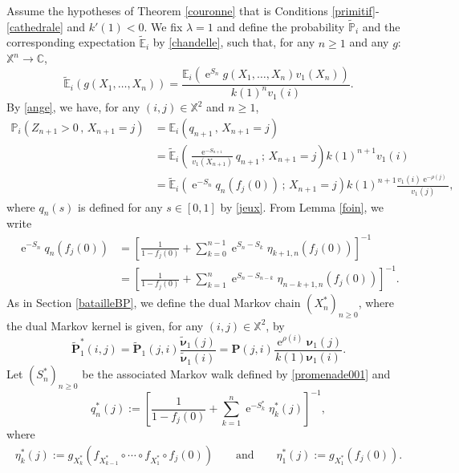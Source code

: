 \documentclass[12pt]{amsart}
\theoremstyle{definition}
\numberwithin{equation}{section}
\def\bb#1{\mathbb{#1}}
\def\bs#1{\boldsymbol{#1}}
\def\bf#1{\mathbf{#1}}
\def\tbf#1{\tilde{\mathbf{#1}}}
\def\tbs#1{\tilde{\boldsymbol{#1}}}
\def\tbb#1{\tilde{\mathbb{#1}}}
\def\geq{\geqslant}
\renewcommand\ll{\lambda}
\DeclareMathOperator{\e}{e}
\begin{document}
Assume the hypotheses of Theorem \ref{couronne} that is  Conditions \ref{primitif}-\ref{cathedrale} and $k'(1)<0$. We fix $\ll = 1$ and define the probability $\tbb P_i$ and the corresponding expectation $\tbb E_i$ by \eqref{chandelle}, such that, for any $n \geq 1$ and any $g$: $\bb X^n \to \bb C$,
\begin{equation}
\label{chandelier}
\tbb E_i \left( g(X_1, \dots, X_n) \right) = \frac{\bb E_i \left( \e^{S_n} g(X_1, \dots, X_n) v_1(X_n) \right)}{k(1)^n v_1(i)}.
\end{equation}
By \eqref{ange}, we have, for any $(i,j) \in \bb X^2$ and $n \geq 1$,
\begin{align*}
\bb P_i \left( Z_{n+1} > 0 \,,\, X_{n+1} = j \right) &= \bb E_i \left( q_{n+1} \,,\, X_{n+1} = j \right) \\
&= \tbb E_i \left( \frac{\e^{-S_{n+1}}}{v_1 \left( X_{n+1} \right)} q_{n+1}  \,;\, X_{n+1} = j \right) k(1)^{n+1} v_1(i) \\
&= \tbb E_i \left( \e^{-S_n} q_n\left( f_j(0) \right)  \,;\, X_{n+1} = j \right) k(1)^{n+1} \frac{v_1(i) \e^{-\rho(j)}}{v_1(j)},
\end{align*}
where $q_n(s)$ is defined for any $s \in [0,1]$ by \eqref{jeux}. From Lemma \ref{foin}, we write
\begin{align}
	\e^{-S_n} q_n\left( f_j(0) \right) &= \left[ \frac{1}{1-f_j(0)} + \sum_{k=0}^{n-1} \e^{S_n -S_k} \eta_{k+1,n}\left( f_j(0) \right) \right]^{-1} \nonumber\\
	&= \left[ \frac{1}{1-f_j(0)} + \sum_{k=1}^{n} \e^{S_n -S_{n-k}} \eta_{n-k+1,n}\left( f_j(0) \right) \right]^{-1}.
	\label{potion001}
\end{align}
As in Section \ref{batailleBP}, we define the dual Markov chain $\left( X_n^* \right)_{n\geq 0}$, where the dual Markov kernel is given, for any $(i,j) \in \bb X^2$, by
\[
\tbf P_1^*(i,j) = \tbf P_1 (j,i) \frac{\tbs \nu_1 (j)}{\tbs \nu_1 (i)} = \bf P(j,i) \frac{\e^{\rho(i)} \bs \nu_1 (j)}{k(1) \bs \nu_1 (i)}.
\]
Let $(S^*_n)_{n\geq 0}$ be the associated Markov walk defined by \eqref{promenade001}
and 
\begin{equation}
\label{chemin}
q_n^*(j) := \left[ \frac{1}{1-f_j(0)} + \sum_{k=1}^{n} \e^{-S_k^*} \eta_k^*(j) \right]^{-1},
\end{equation}
where 
\begin{align}
\label{chemin003}
\eta_k^*(j) := g_{X_k^*} \left( f_{X_{k-1}^*} \circ \cdots \circ f_{X_1^*}\circ f_j (0) \right)  
\qquad \text{and} \qquad \eta_1^*(j) := g_{X_1^*} \left( f_j (0) \right).
\end{align}
\end{document}
